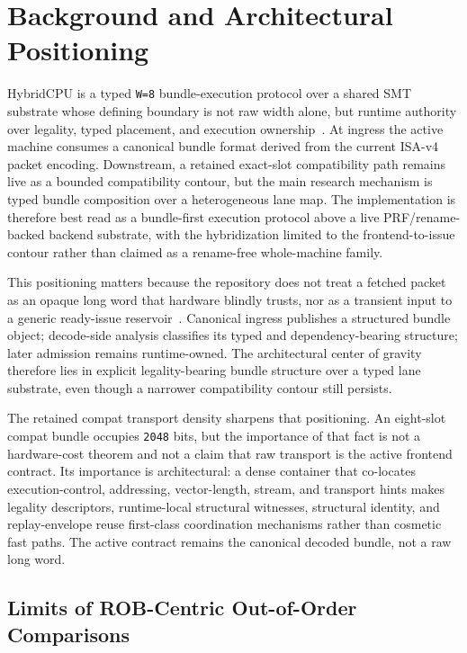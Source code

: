 \documentclass[twocolumn]{article}
\begin{document}
\section{Background and Architectural Positioning}

HybridCPU is a typed \texttt{W=8} bundle-execution protocol over a shared SMT substrate whose defining boundary is not raw width alone, but runtime authority over legality, typed placement, and execution ownership~\cite{tullsen1995smt,kongetira2005niagara,snavely2000symbiotic}. At ingress the active machine consumes a canonical bundle format derived from the current ISA-v4 packet encoding. Downstream, a retained exact-slot compatibility path remains live as a bounded compatibility contour, but the main research mechanism is typed bundle composition over a heterogeneous lane map. The implementation is therefore best read as a bundle-first execution protocol above a live PRF/rename-backed backend substrate, with the hybridization limited to the frontend-to-issue contour rather than claimed as a rename-free whole-machine family.

This positioning matters because the repository does not treat a fetched packet as an opaque long word that hardware blindly trusts, nor as a transient input to a generic ready-issue reservoir~\cite{fisher1983vliw,schlansker2000epic,tomasulo1967efficient,palacharla1997complexity}. Canonical ingress publishes a structured bundle object; decode-side analysis classifies its typed and dependency-bearing structure; later admission remains runtime-owned. The architectural center of gravity therefore lies in explicit legality-bearing bundle structure over a typed lane substrate, even though a narrower compatibility contour still persists.

The retained compat transport density sharpens that positioning. An eight-slot compat bundle occupies \texttt{2048} bits, but the importance of that fact is not a hardware-cost theorem and not a claim that raw transport is the active frontend contract. Its importance is architectural: a dense container that co-locates execution-control, addressing, vector-length, stream, and transport hints makes legality descriptors, runtime-local structural witnesses, structural identity, and replay-envelope reuse first-class coordination mechanisms rather than cosmetic fast paths. The active contract remains the canonical decoded bundle, not a raw long word.


\subsection{Limits of ROB-Centric Out-of-Order Comparisons}
\end{document}
